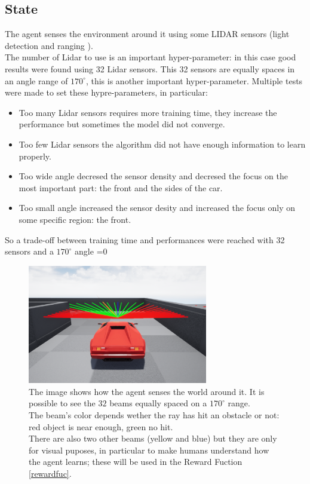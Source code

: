 \documentclass[14pt]{extarticle}
\def\sp{\vspace{5pt}}
\newcounter{debug}
\begin{document}
\begin{flushleft}
	\subsection{State}
	\sp
	The agent senses the environment around it using some LIDAR sensors (light detection and ranging \cite{Lidar}). \\
	The number of Lidar to use is an important hyper-parameter: in this case good results were found using 32 Lidar sensors. This 32 sensors are equally spaces in an angle range of $170^{\circ}$, this is another important hyper-parameter. Multiple tests were made to set these hypre-parameters, in particular:
	\begin{itemize}
	\item Too many Lidar sensors requires more training time, they increase the performance but sometimes the model did not converge.
	\item Too few Lidar sensors the algorithm did not have enough information to learn properly.
	\item Too wide angle decresed the sensor density and decresed the focus on the most important part: the front and the sides of the car.
	\item Too small angle increased the sensor desity and increased the focus only on some specific region: the front.
	\end{itemize}
	So a trade-off between training time and performances were reached with 32 sensors and a $170^{\circ}$ angle
	\ifnum\value{debug}=0 {
	\begin{figure}[H]
    		\centering\includegraphics[width=0.7\textwidth]{./Image/State/carSensors.png}
		\vspace{5mm}
		\caption{The image shows how the agent senses the world around it. It is possible to see the $32$ beams equally spaced on a $170^{\circ}$ range. \\
		The beam's color depends wether the ray has hit an obstacle or not: red object is near enough, green no hit. \\
		There are also two other beams (yellow and blue) but they are only for visual puposes, in particular to make humans understand how the agent learns; these will be used in the Reward Fuction \ref{rewardfuc}.}
	\end{figure}
	}\fi
	

\end{flushleft}
\end{document}
